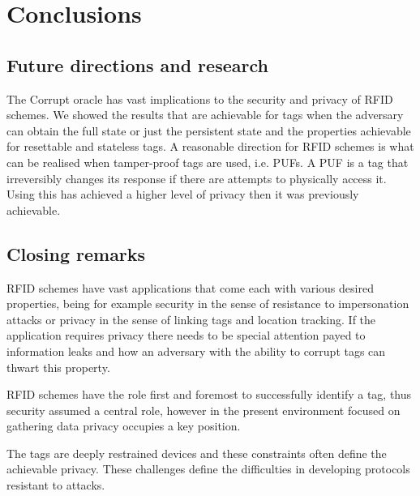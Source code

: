 \chapter*{Conclusions} 

\section*{Future directions and research}
The Corrupt oracle has vast implications to the security and privacy of RFID schemes. We showed the results that are achievable for tags
when the adversary can obtain the full state or just the persistent state and the properties achievable for resettable and stateless tags.
A reasonable direction for RFID schemes is what can be realised when tamper-proof tags are used, i.e. PUFs. A PUF is a tag that irreversibly changes 
its response if there are attempts to physically access it. Using this \cite{PUFs} has achieved a higher level of privacy then it was 
previously achievable.

\section*{Closing remarks}
RFID schemes have vast applications that come each with various desired properties, being for example security in the sense of resistance to impersonation attacks 
or privacy in the sense of linking tags and location tracking. If the application requires privacy there needs to be special attention payed to information leaks
and how an adversary with the ability to corrupt tags can thwart this property.

RFID schemes have the role first and foremost to successfully identify a tag, thus security assumed a central role, however in the present environment focused on 
gathering data privacy occupies a key position.

The tags are deeply restrained devices and these constraints often define the achievable privacy. These challenges define the difficulties in developing protocols
resistant to attacks.